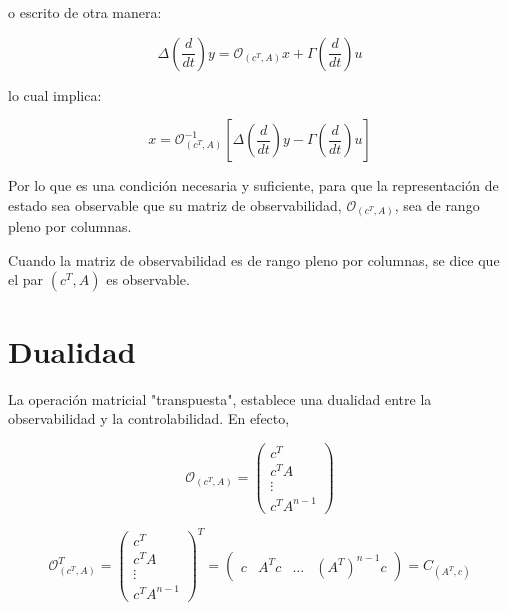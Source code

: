 	o escrito de otra manera:

	\begin{equation*}
		\Delta \left( \frac{d}{dt} \right) y = \mathcal{O}_{(c^T, A)} x + \Gamma \left( \frac{d}{dt} \right) u
	\end{equation*}

	lo cual implica:

	\begin{equation}
		x = \mathcal{O}_{(c^T, A)}^{-1} \left[ \Delta \left( \frac{d}{dt} \right) y - \Gamma \left( \frac{d}{dt} \right) u \right]
	\end{equation}

	Por lo que es una condición necesaria y suficiente, para que la representación de estado sea observable que su matriz de observabilidad, $\mathcal{O}_{(c^T, A)}$, sea de rango pleno por columnas.

	Cuando la matriz de observabilidad es de rango pleno por columnas, se dice que el par $(c^T, A)$ es observable.

    \newpage
    \section{Dualidad}

		La operación matricial "transpuesta", establece una dualidad entre la observabilidad y la controlabilidad. En efecto,

		\begin{equation}
			\mathcal{O}_{(c^T, A)} =
			 \begin{pmatrix}
			 	c^T \\
				c^T A \\
				\vdots \\
				c^T A^{n-1}
			 \end{pmatrix}
		\end{equation}

		\begin{equation}
			\mathcal{O}_{(c^T, A)}^T =
			\begin{pmatrix}
				c^T \\
				c^T A \\
				\vdots \\
				c^T A^{n-1}
			\end{pmatrix}^T =
			\begin{pmatrix}
				c & A^T c & \dots & \left( A^T \right)^{n-1} c
			\end{pmatrix} = C_{(A^T, c)}
		\end{equation}

